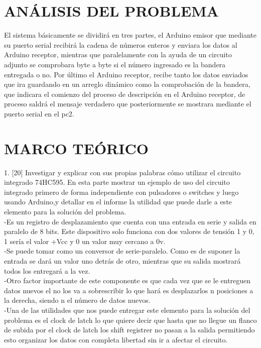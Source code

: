 \documentclass{article}
\begin{document}
\newpage
\section{ANÁLISIS DEL PROBLEMA}
\label{Análisis}

El sistema básicamente se dividirá en tres partes, el Arduino emisor que mediante su puerto serial recibirá la cadena de números enteros y enviara los datos al Arduino receptor, mientras que paralelamente con la ayuda de un circuito adjunto se comprobara byte a byte si el número ingresado es la bandera entregada o no. Por último el Arduino receptor, recibe tanto los datos enviados que ira guardando en un arreglo dinámico como la comprobación de la bandera, que indicara el comienzo del proceso de descripción en el Arduino receptor, de proceso saldrá el mensaje verdadero que posteriormente se mostrara mediante el puerto serial en el pc2.


\newpage
\section{MARCO TEÓRICO}
\label{marco}
\item 1. [20] Investigar y explicar con sus propias palabras cómo utilizar el circuito integrado 74HC595. En esta parte mostrar un ejemplo de uso del circuito integrado primero de forma independiente con pulsadores o switches y luego usando Arduino,y detallar en el informe la utilidad que puede darle a este elemento para la solución del problema.\\

-Es un registro de desplazamiento que cuenta con una entrada en serie y salida en paralelo de 8 bits. Este dispositivo solo funciona con dos valores de tensión 1 y 0, 1 sería el valor +Vcc y 0 un valor muy cercano a 0v.\\

-Se puede tomar como un conversor de serie-paralelo. Como es de suponer la entrada se dará un valor uno detrás de otro, mientras que su salida mostrará todos los entregará a la vez.\\

-Otro factor importante de este componente es que cada vez que se le entreguen datos nuevos el no los va a sobrescribir lo que hará es desplazarlos n posiciones a la derecha, siendo n el número de datos nuevos.\\

-Una de las utilidades que nos puede entregar este elemento para la solución del problema es el clock de latch lo que quiere decir que hasta que no llegue un flanco de subida por el clock de latch los shift registrer no pasan a la salida permitiendo esto organizar los datos con completa libertad sin ir a afectar el circuito.\\
\end{document}
